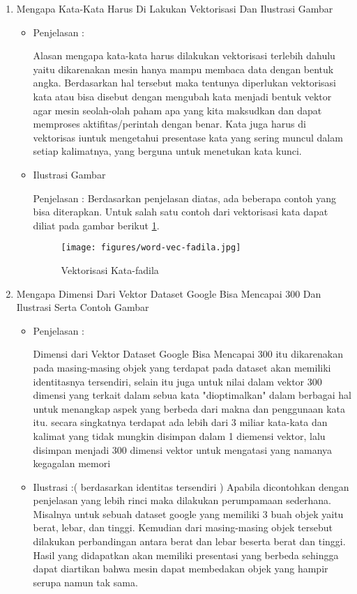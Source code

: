 \begin{enumerate}
\item Mengapa Kata-Kata Harus Di Lakukan Vektorisasi Dan Ilustrasi Gambar
\begin{itemize}
\item Penjelasan :
\par Alasan mengapa kata-kata harus dilakukan vektorisasi terlebih dahulu yaitu dikarenakan mesin hanya mampu membaca data dengan bentuk angka. Berdasarkan hal tersebut maka tentunya diperlukan vektorisasi kata atau bisa disebut dengan mengubah kata menjadi bentuk vektor agar mesin seolah-olah paham apa yang kita maksudkan dan dapat memproses aktifitas/perintah dengan benar. Kata juga harus di vektorisas iuntuk mengetahui presentase kata yang sering muncul dalam setiap kalimatnya, yang berguna untuk menetukan kata kunci.
\par
\item Ilustrasi Gambar
\par Penjelasan : Berdasarkan penjelasan diatas, ada beberapa contoh yang bisa diterapkan. Untuk salah satu contoh dari vektorisasi kata dapat diliat pada gambar berikut \ref{Vektorisasi Kata-fadila}.
\begin{figure}[!hbtp]
\centering
\texttt{[image: figures/word-vec-fadila.jpg]}
\caption{Vektorisasi Kata-fadila}
\label{Vektorisasi Kata-fadila}
\end{figure}
\par
\end{itemize}
\par
\par
\item Mengapa Dimensi Dari Vektor Dataset Google Bisa Mencapai 300 Dan Ilustrasi Serta Contoh Gambar
\begin{itemize}
\item  Penjelasan :
\par Dimensi dari Vektor Dataset Google Bisa Mencapai 300 itu dikarenakan pada masing-masing objek yang terdapat pada dataset akan memiliki identitasnya tersendiri, selain itu juga untuk nilai dalam vektor 300 dimensi yang terkait dalam sebua kata "dioptimalkan" dalam  berbagai hal untuk menangkap aspek yang berbeda dari makna dan penggunaan kata itu. secara singkatnya terdapat ada lebih dari 3 miliar kata-kata dan kalimat yang tidak mungkin disimpan dalam 1 diemensi vektor, lalu disimpan menjadi 300 dimensi vektor untuk mengatasi yang namanya kegagalan memori
\item Ilustrasi :( berdasarkan identitas tersendiri ) Apabila dicontohkan dengan penjelasan yang lebih rinci maka dilakukan perumpamaan sederhana. Misalnya untuk sebuah dataset google yang memiliki 3 buah objek yaitu berat, lebar, dan tinggi.  Kemudian dari masing-masing objek tersebut dilakukan perbandingan antara berat dan lebar beserta berat dan tinggi. Hasil yang didapatkan akan memiliki presentasi yang berbeda sehingga dapat diartikan bahwa mesin dapat membedakan objek yang hampir serupa namun tak sama.

\end{itemize}
\end{enumerate}
